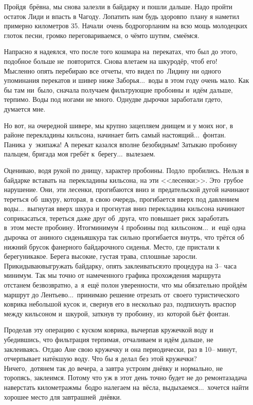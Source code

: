 Пройдя~брёвна, мы снова залезли в байдарку и пошли дальше. Надо пройти остаток Лиди и впасть в Чагоду. Лопатить нам будь здоров\mdash по~плану я наметил примерно километров 35. Начали~очень бодро\mdash горланим на всю мощь молодецких глоток песни, громко переговариваемся, о чём\sdash то шутим, смеёмся.  

Напрасно я надеялся, что после того кошмара на~перекатах, что был до этого, подобное больше не~повторится. Снова влетаем на шкуродёр, чтоб его! Мысленно опять перебираю все отчеты, что видел по~Лиди\mdash ну ни одного упоминания перекатов и шивер ниже Заборья$\ldots$~воды в этом году очень мало. Как бы там ни~было, сначала получаем фильтрующие пробоины и~идём дальше, терпимо. Воды под ногами не много. Одну\sdash две дырочки заработали где\sdash то, думается мне. 

Но вот, на очередной шивере, мы крупно зацепляем днищем и у моих ног, в районе перекладины кильсона, начинает бить самый настоящий$\ldots$~фонтан. Паника~у~экипажа! А перекат казался вполне безобидным! Затыкаю пробоину пальцем, бригада моя гребёт к~берегу$\ldots$~вылезаем. 

Оцениваю, водя рукой по днищу, характер пробоины. Подло~пробились. Нельзя в байдарке вставать на~перекладины кильсона, на эти <<лесенки>>. Это~грубое нарушение. Они, эти лесенки, прогибаются вниз и~предательской дугой начинают тереться об~шкуру, которая, в свою очередь, прогибается вверх под давлением воды$\ldots$~выгнутая вверх шкура и прогнутая вниз перекладина кильсона начинают соприкасаться, тереться даже друг об~друга, что повышает риск заработать в~этом месте пробоину. Итог\mdash минимум 4 пробоины под~кильсоном$\ldots$~и~ещё одна дырочка от аниного сиденья\mdash шкура так сильно прогибается внутрь, что трётся об нижний брусок фанерного байдарочного сиденья. 
\newpage
Место, где пристали к берегу\mdash никакое. Берега высокие, густая трава, сплошные заросли. Прикидываю\mdash выгружать байдарку, опять заклеиваться\mdash это процедура на 3\thinspace\nobreakdash-- часа минимум. Так мы точно от намеченного графика прохождения маршрута отстанем безвозвратно, а~я~ещё полон уверенности, что мы обязательно пройдём маршрут до Лентьево$\ldots$~принимаю решение отрезать от~своего туристического коврика небольшой кусок и, свернув его в несколько раз, подпихнуть враспор между кильсоном и~шкурой, заткнув ту пробоину, из~которой бьёт фонтан. 

Проделав эту операцию с куском коврика, вычерпав кружечкой воду и убедившись, что фильтрация терпимая, отчаливаем и идём дальше, не заклеиваясь. Отдаю Ане свою кружечку и она периодически, раз в 10\thinspace-- минут, отчерпывает натёкшую воду. Что бы я делал без этой кружечки? Ничего,~дотянем так до вечера, а завтра устроим днёвку и нормально, не торопясь, заклеимся. Потому что уж в этот день точно будет не до ремонта\mdash задача наверстать километраж\mdash мы~бодро налегаем на~вёсла, выдыхаемся$\ldots$~хочется найти хорошее место для завтрашней~днёвки.

